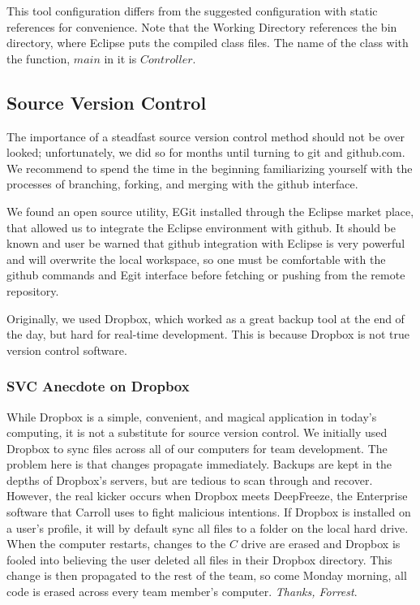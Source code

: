 \documentclass[12pt]{article}
\begin{document}
This tool configuration differs from the suggested configuration with static references for convenience.  Note that the Working Directory references the bin directory, where Eclipse puts the compiled class files.  The name of the class with the function, $main$ in it is $Controller$.

\subsection{Source Version Control}
The importance of a steadfast source version control method should not be over looked; unfortunately, we did so for months until turning to git and github.com.  We recommend to spend the time in the beginning familiarizing yourself with the processes of branching, forking, and merging with the github interface.  

We found an open source utility, EGit installed through the Eclipse market place, that allowed us to integrate the Eclipse environment with github.  It should be known and user be warned that github integration with Eclipse is very powerful and will overwrite the local workspace, so one must be comfortable with the github commands and Egit interface before fetching or pushing from the remote repository.

Originally, we used Dropbox, which worked as a great backup tool at the end of the day, but hard for real-time development.  This is because Dropbox is not true version control software.

\subsubsection*{SVC Anecdote on Dropbox}
While Dropbox is a simple, convenient, and magical application in today's computing, it is not a substitute for source version control.  We initially used Dropbox to sync files across all of our computers for team development.  The problem here is that changes propagate immediately.  Backups are kept in the depths of Dropbox's servers, but are tedious to scan through and recover.  However, the real kicker occurs when Dropbox meets DeepFreeze, the Enterprise software that Carroll uses to fight malicious intentions.  If Dropbox is installed on a user's profile, it will by default sync all files to a folder on the local hard drive.  When the computer restarts, changes to the $C$ drive are erased and Dropbox is fooled into believing the user deleted all files in their Dropbox directory.  This change is then propagated to the rest of the team, so come Monday morning, all code is erased across every team member's computer.  \textit{Thanks, Forrest}.
\end{document}
